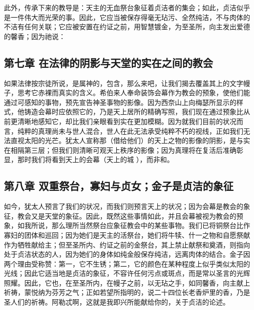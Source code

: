 此外，传承下来的教导是：天主的无血祭台象征着贞洁者的集会；如此，贞洁似乎是一件伟大而光荣的事。因此，它应当被保存得毫无玷污、全然纯洁，不与肉体的不洁有任何关联；它应被安置在约证之前，用智慧镀金，为至圣所，向主发出爱德的馨香；因为祂说： \par


\subsection{第七章 在法律的阴影与天堂的实在之间的教会}

如果法律按宗徒所说，是属神的，包含，那么来吧，让我们揭去覆盖其上的文字幔子，思考它赤裸而真实的含义。希伯来人奉命装饰会幕作为教会的预象，使他们能通过可感知的事物，预先宣告神圣事物的影像。因为西奈山上向梅瑟所显示的样式，他铸造会幕时应依照它的，乃是天上居所的精确写照，我们现在通过预象比从前更清晰地感知它，却比我们亲眼看到实在更加模糊。因为就我们目前的状况而言，纯粹的真理尚未与世人混合，世人在此无法承受纯粹不朽的视线，正如我们无法直视太阳的光芒。犹太人宣称那（借给他们）的天上之物的影像的阴影，是与实在相隔第三层；但我们则清晰可观天上秩序的影像；因为真理将在复活后准确彰显，那时我们将看到天上的会幕（天上的城 ），而非和。\par


\subsection{第八章 双重祭台，寡妇与贞女；金子是贞洁的象征}

如今，犹太人预言了我们的状况，而我们则预言天上的状况；因为会幕是教会的象征，教会又是天堂的象征。因此，既然这些事情如此，并且会幕被视为教会的预象，如我所说，那么理所当然祭台应象征教会中的某些事物。我们已将铜祭台比作寡妇的团体和巡回；因为她们是天主的活祭台，她们将牛犊、什一之物和自愿祭献作为牺牲献给主；但至圣所内、约证之前的金祭台，其上禁止献祭和奠酒，则指向处于贞洁状态的人，因为她们的身体如纯金般保存纯洁，远离肉体的结合。金子因两个理由受称赞：第一，它不生锈；第二，它的颜色在某种程度上似乎类似太阳的光线；因此它适当地是贞洁的象征，不容许任何污点或斑点，而是常以圣言的光辉照耀。因此，它也，在至圣所内，在幔子之前，以无玷之手，如同馨香，向主献上祈祷，蒙悦纳为芬芳之气；正如若望所指明的，说二十四位长老香炉里的香，乃是圣人们的祈祷。阿勒忒啊，这就是我即兴所能献给你的，关于贞洁的论述。\par

